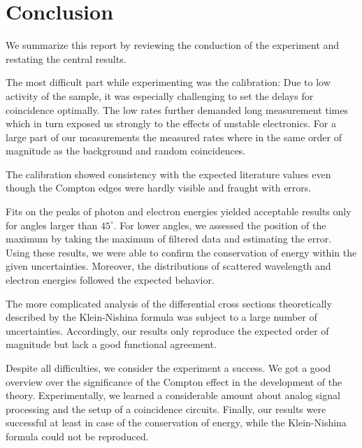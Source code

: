\section{Conclusion}
We summarize this report by reviewing the conduction of the experiment and restating the central results.

The most difficult part while experimenting was the calibration: Due to low activity of the sample, it was especially 
challenging to set the delays for coincidence optimally. The low rates further demanded long measurement times which in 
turn exposed us strongly to the effects of unstable electronics. For a large part of our measurements the measured rates 
where in the same order of magnitude as the background and random coincidences. 

The calibration showed consistency with the expected literature values even though the Compton edges were hardly visible 
and fraught with errors. 

Fits on the peaks of photon and electron energies yielded acceptable results only for angles larger than $45^\circ$. 
For lower angles, we assessed the position of the maximum by taking the maximum of filtered data and estimating the error. 
Using these results, we were able to confirm the conservation of energy within the given uncertainties. Moreover, 
the distributions of scattered wavelength and electron energies followed the expected behavior. 

The more complicated analysis of the differential cross sections theoretically described by the Klein-Nishina formula was 
subject to a large number of uncertainties. Accordingly, our results only reproduce the expected order of magnitude but 
lack a good functional agreement. 

Despite all difficulties, we consider the experiment a success. We got a good overview over the significance of the Compton
effect in the development of the theory. Experimentally, we learned a considerable amount about analog signal processing 
and the setup of a coincidence circuits. Finally, our results were successful at least in case of the conservation of 
energy, while the Klein-Nishina formula could not be reproduced. 
